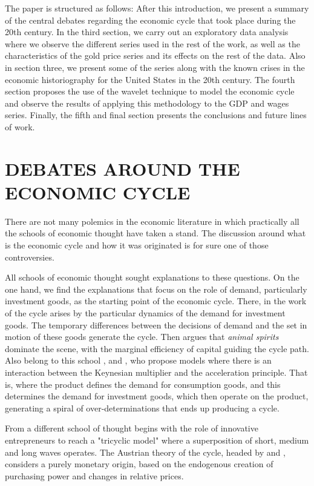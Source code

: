 \documentclass[a4paper,10cpi]{article}
\begin{document}
	The paper is structured as follows: After this introduction, we present a summary of the central debates regarding the economic cycle that took place during the 20th century. In the third section, we carry out an exploratory data analysis where we observe the different series used in the rest of the work, as well as the characteristics of the gold price series and its effects on the rest of the data. Also in section three, we present some of the series along with the known crises in the economic historiography for the United States in the 20th century. The fourth section proposes the use of the wavelet technique to model the economic cycle and observe the results of applying this methodology to the GDP and wages series. Finally, the fifth and final section presents the conclusions and future lines of work.
	
	
	\section{\uppercase{\textbf{\normalsize{Debates around the economic cycle}}}}
	
	There are not many polemics in the economic literature in which practically all the schools of economic thought have taken a stand. The discussion around what is the economic cycle and how it was originated is for sure one of those controversies.
	
	All schools of economic thought sought explanations to these questions. On the one hand, we find the explanations that focus on the role of demand, particularly investment goods, as the starting point of the economic cycle. There, in the work of \cite{kalecki2013essays} the cycle arises by the particular dynamics of the demand for investment goods. The temporary differences between the decisions of demand and the set in motion of these goods generate the cycle. Then \cite{keynes2018general} argues that \textit{animal spirits} dominate the scene, with the marginal efficiency of capital guiding the cycle path. Also belong to this school \cite {harrod1936trade}, \cite{kaldor1940model} and \cite{samuelson1939synthesis}, who propose models where there is an interaction between the Keynesian multiplier and the acceleration principle. That is, where the product defines the demand for consumption goods, and this determines the demand for investment goods, which then operate on the product, generating a spiral of over-determinations that ends up producing a cycle.
	
	From a different school of thought \cite{schumpeter1939business} begins with the role of innovative entrepreneurs to reach a "tricyclic model" where a superposition of short, medium and long waves operates.
	The Austrian theory of the cycle, headed by \cite{hayek1933} and \cite{von1943elastic}, considers a purely monetary origin, based on the endogenous creation of purchasing power and changes in relative prices.
	
\end{document}
